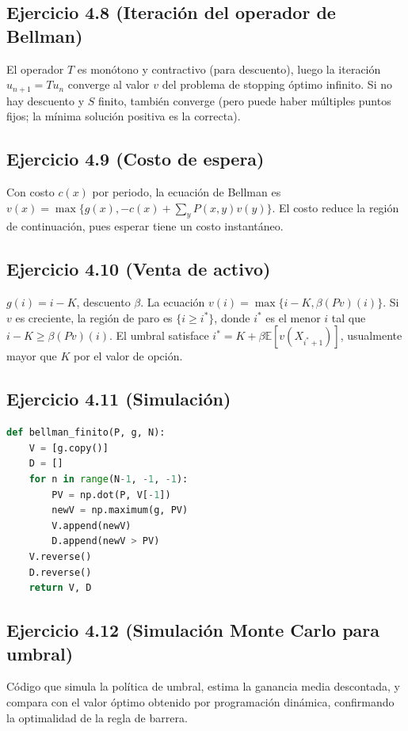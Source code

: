 \documentclass[12pt]{article}
\newcommand{\E}{\mathbb{E}}
\newcommand{\1}{\mathbf{1}}
\begin{document}
\subsection{Ejercicio 4.8 (Iteraci\'on del operador de Bellman)}
El operador $T$ es mon\'otono y contractivo (para descuento), luego la iteraci\'on $u_{n+1}=Tu_n$ converge al valor $v$ del problema de stopping \'optimo infinito. Si no hay descuento y $S$ finito, tambi\'en converge (pero puede haber m\'ultiples puntos fijos; la m\'inima soluci\'on positiva es la correcta).

\subsection{Ejercicio 4.9 (Costo de espera)}
Con costo $c(x)$ por periodo, la ecuaci\'on de Bellman es $v(x)=\max\{g(x), -c(x)+\sum_y P(x,y)v(y)\}$. El costo reduce la regi\'on de continuaci\'on, pues esperar tiene un costo instant\'aneo.

\subsection{Ejercicio 4.10 (Venta de activo)}
$g(i)=i-K$, descuento $\beta$. La ecuaci\'on $v(i)=\max\{i-K,\beta(Pv)(i)\}$. Si $v$ es creciente, la regi\'on de paro es $\{i\ge i^*\}$, donde $i^*$ es el menor $i$ tal que $i-K\ge\beta(Pv)(i)$. El umbral satisface $i^*=K+\beta\E[v(X_{i^*+1})]$, usualmente mayor que $K$ por el valor de opci\'on.

\subsection{Ejercicio 4.11 (Simulaci\'on)}
\begin{lstlisting}[language=Python, caption=Iteraci\'on de Bellman]
def bellman_finito(P, g, N):
    V = [g.copy()]
    D = []
    for n in range(N-1, -1, -1):
        PV = np.dot(P, V[-1])
        newV = np.maximum(g, PV)
        V.append(newV)
        D.append(newV > PV)
    V.reverse()
    D.reverse()
    return V, D
\end{lstlisting}

\subsection{Ejercicio 4.12 (Simulaci\'on Monte Carlo para umbral)}
C\'odigo que simula la pol\'itica de umbral, estima la ganancia media descontada, y compara con el valor \'optimo obtenido por programaci\'on din\'amica, confirmando la optimalidad de la regla de barrera.
\end{document}
